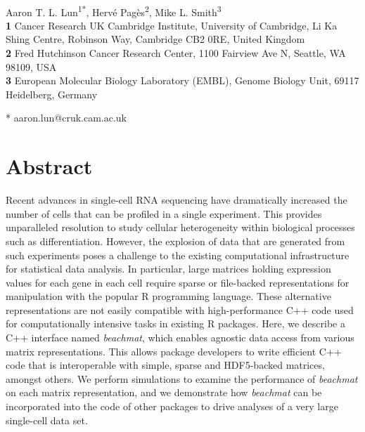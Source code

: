 \documentclass[10pt,letterpaper]{article}
\date{}
\newcommand{\beachmat}{\textit{beachmat}}
\begin{document}
\begin{flushleft}
{\Large
\textbf{} %
}
\newline
\\

Aaron T. L. Lun\textsuperscript{1*},
Herv\'e Pag\`es\textsuperscript{2},
Mike L. Smith\textsuperscript{3}
\\
\bigskip
\textbf{1} Cancer Research UK Cambridge Institute, University of Cambridge, Li Ka Shing Centre, Robinson Way, Cambridge CB2 0RE, United Kingdom 
\\
\textbf{2} Fred Hutchinson Cancer Research Center, 1100 Fairview Ave N, Seattle, WA 98109, USA
 \\
\textbf{3} European Molecular Biology Laboratory (EMBL), Genome Biology Unit, 69117 Heidelberg, Germany
\\
\bigskip


* aaron.lun@cruk.cam.ac.uk

\end{flushleft}
\section*{Abstract}
Recent advances in single-cell RNA sequencing have dramatically increased the number of cells that can be profiled in a single experiment.
This provides unparalleled resolution to study cellular heterogeneity within biological processes such as differentiation.
However, the explosion of data that are generated from such experiments poses a challenge to the existing computational infrastructure for statistical data analysis.
In particular, large matrices holding expression values for each gene in each cell require sparse or file-backed representations for manipulation with the popular R programming language.
These alternative representations are not easily compatible with high-performance C++ code used for computationally intensive tasks in existing R packages.
Here, we describe a C++ interface named \beachmat{}, which enables agnostic data access from various matrix representations.
This allows package developers to write efficient C++ code that is interoperable with simple, sparse and HDF5-backed matrices, amongst others.
We perform simulations to examine the performance of \beachmat{} on each matrix representation, 
and we demonstrate how \beachmat{} can be incorporated into the code of other packages to drive analyses of a very large single-cell data set.
\end{document}
